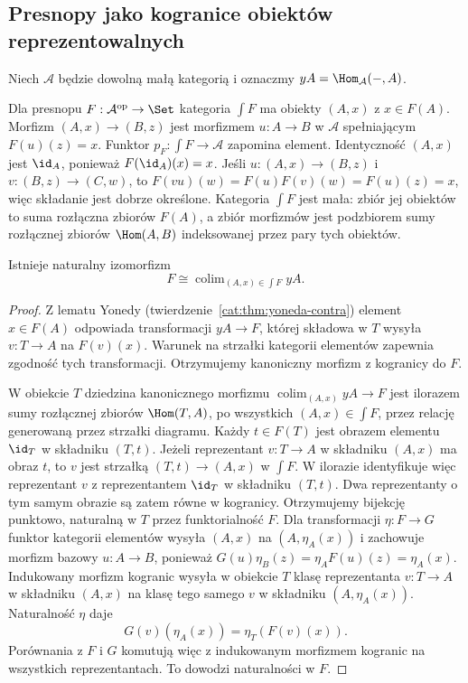 \subsection{Presnopy jako kogranice obiektów reprezentowalnych}

Niech $\mathcal A$ będzie dowolną małą kategorią i oznaczmy $yA=\Hom_{\mathcal A}(-,A)$.

\begin{definicja}\label{cat:def:accessible-elements}
Dla presnopu $F:\mathcal A^{\mathrm{op}}\to\Set$ kategoria $\int F$ ma obiekty $(A,x)$ z $x\in F(A)$. Morfizm $(A,x)\to(B,z)$ jest morfizmem $u:A\to B$ w $\mathcal A$ spełniającym $F(u)(z)=x$. Funktor $p_F:\int F\to\mathcal A$ zapomina element. Identyczność $(A,x)$ jest $\id_A$, ponieważ $F(\id_A)(x)=x$. Jeśli $u:(A,x)\to(B,z)$ i $v:(B,z)\to(C,w)$, to $F(vu)(w)=F(u)F(v)(w)=F(u)(z)=x$, więc składanie jest dobrze określone. Kategoria $\int F$ jest mała: zbiór jej obiektów to suma rozłączna zbiorów $F(A)$, a zbiór morfizmów jest podzbiorem sumy rozłącznej zbiorów $\Hom(A,B)$ indeksowanej przez pary tych obiektów.
\end{definicja}

\begin{twierdzenie}\label{cat:thm:accessible-elements-colimit}
Istnieje naturalny izomorfizm
\[
 F\cong\operatorname{colim}_{(A,x)\in\int F}yA.
\]
\end{twierdzenie}
\begin{proof}
Z lematu Yonedy (twierdzenie~\ref{cat:thm:yoneda-contra}) element $x\in F(A)$ odpowiada transformacji $yA\to F$, której składowa w $T$ wysyła $v:T\to A$ na $F(v)(x)$. Warunek na strzałki kategorii elementów zapewnia zgodność tych transformacji. Otrzymujemy kanoniczny morfizm z kogranicy do $F$.

W obiekcie $T$ dziedzina kanonicznego morfizmu $\operatorname{colim}_{(A,x)}yA\to F$ jest ilorazem sumy rozłącznej zbiorów $\Hom(T,A)$, po wszystkich $(A,x)\in\int F$, przez relację generowaną przez strzałki diagramu. Każdy $t\in F(T)$ jest obrazem elementu $\id_T$ w składniku $(T,t)$. Jeżeli reprezentant $v:T\to A$ w składniku $(A,x)$ ma obraz $t$, to $v$ jest strzałką $(T,t)\to(A,x)$ w $\int F$. W ilorazie identyfikuje więc reprezentant $v$ z reprezentantem $\id_T$ w składniku $(T,t)$. Dwa reprezentanty o tym samym obrazie są zatem równe w kogranicy. Otrzymujemy bijekcję punktowo, naturalną w $T$ przez funktorialność $F$. Dla transformacji $\eta:F\to G$ funktor kategorii elementów wysyła $(A,x)$ na $(A,\eta_A(x))$ i zachowuje morfizm bazowy $u:A\to B$, ponieważ $G(u)\eta_B(z)=\eta_A F(u)(z)=\eta_A(x)$. Indukowany morfizm kogranic wysyła w obiekcie $T$ klasę reprezentanta $v:T\to A$ w składniku $(A,x)$ na klasę tego samego $v$ w składniku $(A,\eta_A(x))$. Naturalność $\eta$ daje
\[
 G(v)(\eta_A(x))=\eta_T(F(v)(x)).
\]
Porównania z $F$ i $G$ komutują więc z indukowanym morfizmem kogranic na wszystkich reprezentantach. To dowodzi naturalności w $F$.
\end{proof}

